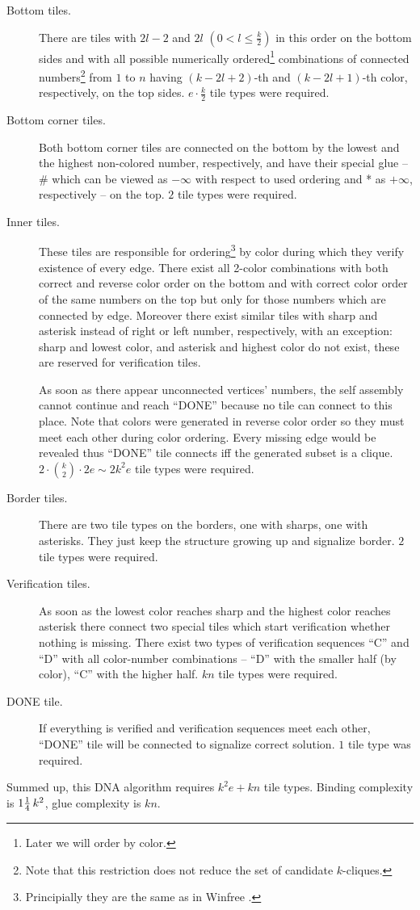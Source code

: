 \begin{description}
	\item[Bottom tiles.] There are tiles with $2l-2$ and $2l$ $(0 < l \leq \frac{k}{2})$ in this order on the bottom sides and with all possible numerically ordered\footnote{Later we will order by color.} combinations of connected numbers\footnote{Note that this restriction does not reduce the set of candidate $k$-cliques.} from $1$ to $n$ having $(k-2l+2)$-th and $(k-2l+1)$-th color, respectively, on the top sides. $e\cdot \frac{k}{2}$ tile types were required.
	\item[Bottom corner tiles.] Both bottom corner tiles are connected on the bottom by the lowest and the highest non-colored number, respectively, and have their special glue -- \# which can be viewed as $-\infty$ with respect to used ordering and * as $+\infty$, respectively -- on the top. $2$ tile types were required.
	\item[Inner tiles.] These tiles are responsible for ordering\footnote{Principially they are the same as in Winfree \cite{winfree_phd}.} by color during which they verify existence of every edge. There exist all 2-color combinations with both correct and reverse color order on the bottom and with correct color order of the same numbers on the top but only for those numbers which are connected by edge. Moreover there exist similar tiles with sharp and asterisk instead of right or left number, respectively, with an exception: sharp and lowest color, and asterisk and highest color do not exist, these are reserved for verification tiles.
	
	As soon as there appear unconnected vertices' numbers, the self assembly cannot continue and reach ``DONE'' because no tile can connect to this place. Note that colors were generated in reverse color order so they must meet each other during color ordering. Every missing edge would be revealed thus ``DONE'' tile connects iff the generated subset is a clique. $2\cdot\binom{k}{2}\cdot 2e \sim 2 k^2 e$ tile types were required. %
	\item[Border tiles.] There are two tile types on the borders, one with sharps, one with asterisks. They just keep the structure growing up and signalize border. $2$ tile types were required.
	\item[Verification tiles.] As soon as the lowest color reaches sharp and the highest color reaches asterisk there connect two special tiles which start verification whether nothing is missing. There exist two types of verification sequences ``C'' and ``D'' with all color-number combinations -- ``D'' with the smaller half (by color), ``C'' with the higher half. $kn$ tile types were required.
	\item[DONE tile.] If everything is verified and verification sequences meet each other, ``DONE'' tile will be connected to signalize correct solution. $1$ tile type was required.
\end{description}
Summed up, this DNA algorithm requires $k^2 e + kn$ tile types. Binding complexity is $1\nicefrac{1}{4}\,k^2$, glue complexity is $kn$.

